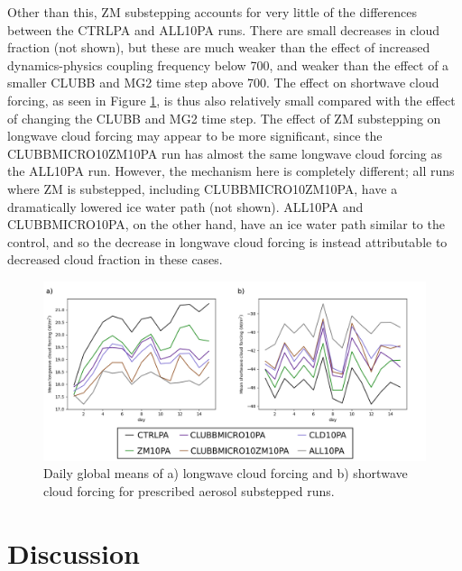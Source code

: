\documentclass [11pt, proquest] {uwthesis}[2020/02/24]
\begin{document}
Other than this, ZM substepping accounts for very little of the differences between the CTRLPA and ALL10PA runs. There are small decreases in cloud fraction (not shown), but these are much weaker than the effect of increased dynamics-physics coupling frequency below \SI{700}{\millibar}, and weaker than the effect of a smaller CLUBB and MG2 time step above \SI{700}{\millibar}. The effect on shortwave cloud forcing, as seen in Figure \ref{fig:cld-frc-pa}, is thus also relatively small compared with the effect of changing the CLUBB and MG2 time step. The effect of ZM substepping on longwave cloud forcing may appear to be more significant, since the CLUBBMICRO10ZM10PA run has almost the same longwave cloud forcing as the ALL10PA run. However, the mechanism here is completely different; all runs where ZM is substepped, including CLUBBMICRO10ZM10PA, have a dramatically lowered ice water path (not shown). ALL10PA and CLUBBMICRO10PA, on the other hand, have an ice water path similar to the control, and so the decrease in longwave cloud forcing is instead attributable to decreased cloud fraction in these cases.

\begin{figure}
    \centering
    \includegraphics[width=6.5in]{Figure15.png}
    \caption[Radiative cloud forcing over time for short prescribed-aerosol EAMv1 runs using different forms of substepping]{Daily global means of a) longwave cloud forcing and b) shortwave cloud forcing for prescribed aerosol substepped runs.}
    \label{fig:cld-frc-pa}
\end{figure}

\section{Discussion} \label{sec:EAM-discussion}
\end{document}
